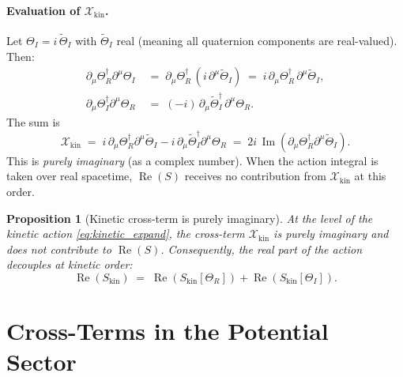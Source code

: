 \documentclass[12pt]{article}
\newtheorem{proposition}{Proposition}
\begin{document}
\paragraph{Evaluation of $\mathcal{X}_\mathrm{kin}$.}
Let $\Theta_I = i\,\widetilde\Theta_I$ with $\widetilde\Theta_I$
real (meaning all quaternion components are real-valued).  Then:
\begin{align}
  \partial_\mu\Theta_R^\dagger \partial^\mu\Theta_I
  &\;=\; \partial_\mu\Theta_R^\dagger \,(i\,\partial^\mu\widetilde\Theta_I)
  \;=\; i\,\partial_\mu\Theta_R^\dagger \,\partial^\mu\widetilde\Theta_I, \\
  \partial_\mu\Theta_I^\dagger \partial^\mu\Theta_R
  &\;=\; (-i)\,\partial_\mu\widetilde\Theta_I^\dagger\,\partial^\mu\Theta_R.
\end{align}
The sum is
\begin{equation}
  \mathcal{X}_\mathrm{kin}
  \;=\; i\,\partial_\mu\Theta_R^\dagger \partial^\mu\widetilde\Theta_I
       - i\,\partial_\mu\widetilde\Theta_I^\dagger \partial^\mu\Theta_R
  \;=\; 2i\,\operatorname{Im}\!\left(
        \partial_\mu\Theta_R^\dagger \partial^\mu\widetilde\Theta_I
        \right).
  \label{eq:cross_kin_result}
\end{equation}
This is \emph{purely imaginary} (as a complex number).  When the
action integral is taken over real spacetime, $\operatorname{Re}(S)$
receives no contribution from $\mathcal{X}_\mathrm{kin}$ at this order.

\begin{proposition}[Kinetic cross-term is purely imaginary]
\label{prop:kin_cross}
At the level of the kinetic action \eqref{eq:kinetic_expand}, the
cross-term $\mathcal{X}_\mathrm{kin}$ is purely imaginary and does
not contribute to $\operatorname{Re}(S)$.  Consequently, the real
part of the action decouples at kinetic order:
\begin{equation}
  \operatorname{Re}(S_\mathrm{kin})
  \;=\; \operatorname{Re}(S_\mathrm{kin}[\Theta_R])
       + \operatorname{Re}(S_\mathrm{kin}[\Theta_I]).
\end{equation}
\end{proposition}

\section{Cross-Terms in the Potential Sector}
\end{document}
